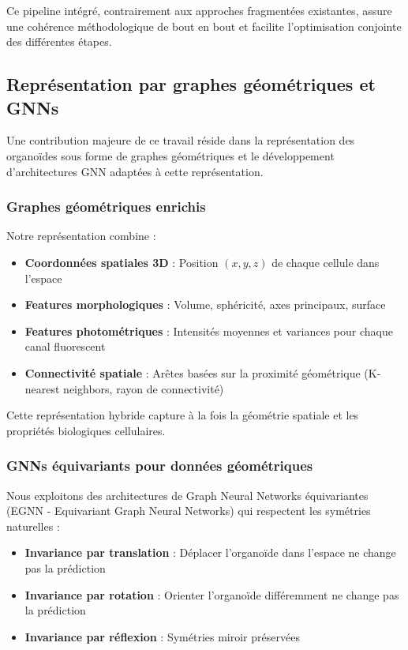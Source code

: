 Ce pipeline intégré, contrairement aux approches fragmentées existantes, assure une cohérence méthodologique de bout en bout et facilite l'optimisation conjointe des différentes étapes.

\subsection{Représentation par graphes géométriques et GNNs}

Une contribution majeure de ce travail réside dans la représentation des organoïdes sous forme de graphes géométriques et le développement d'architectures GNN adaptées à cette représentation.

\subsubsection{Graphes géométriques enrichis}

Notre représentation combine :
\begin{itemize}
    \item \textbf{Coordonnées spatiales 3D} : Position $(x, y, z)$ de chaque cellule dans l'espace
    \item \textbf{Features morphologiques} : Volume, sphéricité, axes principaux, surface
    \item \textbf{Features photométriques} : Intensités moyennes et variances pour chaque canal fluorescent
    \item \textbf{Connectivité spatiale} : Arêtes basées sur la proximité géométrique (K-nearest neighbors, rayon de connectivité)
\end{itemize}

Cette représentation hybride capture à la fois la géométrie spatiale et les propriétés biologiques cellulaires.

\subsubsection{GNNs équivariants pour données géométriques}

Nous exploitons des architectures de Graph Neural Networks équivariantes (EGNN - Equivariant Graph Neural Networks) qui respectent les symétries naturelles :
\begin{itemize}
    \item \textbf{Invariance par translation} : Déplacer l'organoïde dans l'espace ne change pas la prédiction
    \item \textbf{Invariance par rotation} : Orienter l'organoïde différemment ne change pas la prédiction
    \item \textbf{Invariance par réflexion} : Symétries miroir préservées
\end{itemize}

